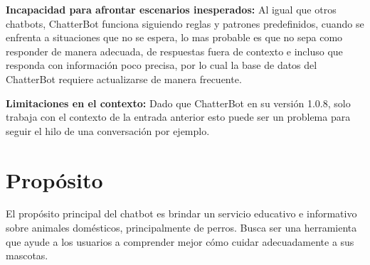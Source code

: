 \documentclass[a4paper,12pt]{article}
\begin{document}
\textbf{Incapacidad para afrontar escenarios inesperados:}  Al igual que otros chatbots, ChatterBot funciona 
siguiendo reglas y patrones predefinidos, cuando se enfrenta a situaciones que no se espera, lo mas probable es que 
no sepa como responder de manera adecuada, de respuestas fuera de contexto e incluso que responda con información 
poco precisa, por lo cual la base de datos del ChatterBot requiere actualizarse de manera frecuente.

\textbf{Limitaciones en el contexto:} Dado que ChatterBot en su versión 1.0.8, solo trabaja con el contexto de 
la entrada anterior esto puede ser un problema para seguir el hilo de una conversación por ejemplo. 




\section{Propósito}

El propósito principal del chatbot es brindar un servicio educativo e informativo sobre animales domésticos, principalmente de perros. Busca ser una herramienta que ayude a los usuarios a comprender mejor cómo cuidar adecuadamente a sus mascotas.\\
\end{document}
